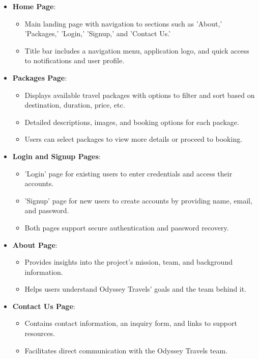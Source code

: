 \documentclass{scrreprt}
\begin{document}
\begin{itemize}
    \item \textbf{Home Page}:
    \begin{itemize}
        \item Main landing page with navigation to sections such as 'About,' 'Packages,' 'Login,' 'Signup,' and 'Contact Us.'
        \item Title bar includes a navigation menu, application logo, and quick access to notifications and user profile.
    \end{itemize}
    
    \item \textbf{Packages Page}:
    \begin{itemize}
        \item Displays available travel packages with options to filter and sort based on destination, duration, price, etc.
        \item Detailed descriptions, images, and booking options for each package.
        \item Users can select packages to view more details or proceed to booking.
    \end{itemize}
    
    \item \textbf{Login and Signup Pages}:
    \begin{itemize}
        \item 'Login' page for existing users to enter credentials and access their accounts.
        \item 'Signup' page for new users to create accounts by providing name, email, and password.
        \item Both pages support secure authentication and password recovery.
    \end{itemize}
    
    \item \textbf{About Page}:
    \begin{itemize}
        \item Provides insights into the project’s mission, team, and background information.
        \item Helps users understand Odyssey Travels' goals and the team behind it.
    \end{itemize}
    
    \item \textbf{Contact Us Page}:
    \begin{itemize}
        \item Contains contact information, an inquiry form, and links to support resources.
        \item Facilitates direct communication with the Odyssey Travels team.
    \end{itemize}
    

\end{itemize}
\end{document}
